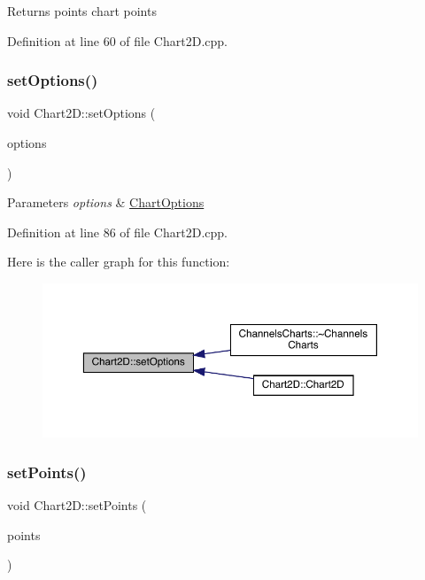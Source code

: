 \begin{DoxyReturn}{Returns}
points chart points 
\end{DoxyReturn}


Definition at line 60 of file Chart2\+D.\+cpp.

\mbox{\label{class_chart2_d_a7a871b06da3b23bd7b452b75107132a6}} 
\subsubsection{\texorpdfstring{set\+Options()}{setOptions()}}
{\footnotesize\ttfamily void Chart2\+D\+::set\+Options (\begin{DoxyParamCaption}\item[{int}]{options }\end{DoxyParamCaption})}


\begin{DoxyParams}{Parameters}
{\em options} & \hyperlink{struct_chart2_d_1_1_chart_options}{Chart\+Options} \\
\hline
\end{DoxyParams}


Definition at line 86 of file Chart2\+D.\+cpp.

Here is the caller graph for this function\+:
\nopagebreak
\begin{figure}[H]
\begin{center}
\leavevmode
\includegraphics[width=350pt]{class_chart2_d_a7a871b06da3b23bd7b452b75107132a6_icgraph}
\end{center}
\end{figure}
\mbox{\label{class_chart2_d_a90db5078374163beef86536a33bbe8ba}} 
\subsubsection{\texorpdfstring{set\+Points()}{setPoints()}}
{\footnotesize\ttfamily void Chart2\+D\+::set\+Points (\begin{DoxyParamCaption}\item[{Q\+Vector$<$ Q\+PointF $>$}]{points }\end{DoxyParamCaption})}


